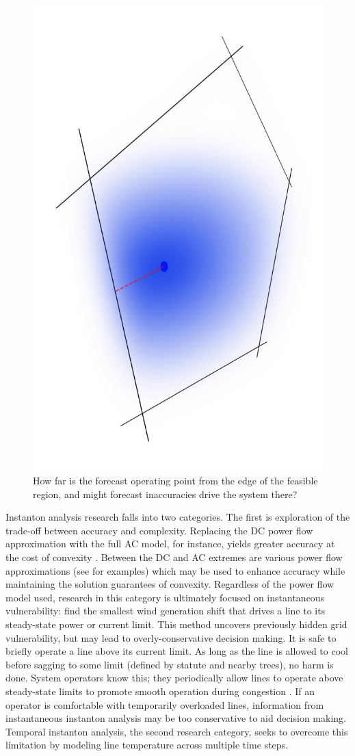 \documentclass[journal,twoside]{IEEEtran}
\begin{document}
\begin{figure}
\centering
\includegraphics[angle=90,width=0.7\linewidth]{stylizedFeas}
\caption{How far is the forecast operating point from the edge of the feasible region, and might forecast inaccuracies drive the system there?}
\label{fig:stylizedFeas}
\end{figure}

Instanton analysis research falls into two categories. The first is exploration of the trade-off between accuracy and complexity. Replacing the DC power flow approximation with the full AC model, for instance, yields greater accuracy at the cost of convexity \cite{baghsorkhi2012}. Between the DC and AC extremes are various power flow approximations (see \cite{coffrin2012,hijazi2013,coffrin2014} for examples) which may be used to enhance accuracy while maintaining the solution guarantees of convexity. Regardless of the power flow model used, research in this category is ultimately focused on instantaneous vulnerability: find the smallest wind generation shift that drives a line to its steady-state power or current limit. This method uncovers previously hidden grid vulnerability, but may lead to overly-conservative decision making. It is safe to briefly operate a line above its current limit. As long as the line is allowed to cool before sagging to some limit (defined by statute and nearby trees), no harm is done. System operators know this; they periodically allow lines to operate above steady-state limits to promote smooth operation during congestion \cite{banakar2005}. If an operator is comfortable with temporarily overloaded lines, information from instantaneous instanton analysis may be too conservative to aid decision making. Temporal instanton analysis, the second research category, seeks to overcome this limitation by modeling line temperature across multiple time steps.
\end{document}
